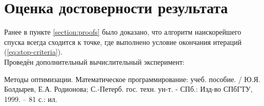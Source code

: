 \documentclass[main.tex]{subfiles}
\begin{document}
\section{Оценка достоверности результата}
Ранее в пункте \ref{section:proofs} было доказано, что алгоритм наискорейшего спуска всегда сходится к точке, где выполнено условие окончания итераций (\ref{eq:stop-criteria}). \\
Проведён дополнительный вычислительный эксперимент: 



\begin{thebibliography}{99}
	 Методы оптимизации. Математическое программирование: учеб. пособие. / Ю.Я. Болдырев, Е.А. Родионова; С.-Петерб. гос. техн. ун-т. - СПб.: Изд-во СПбГТУ, 1999. -- 81 с.: ил.
\end{thebibliography}
\end{document}
